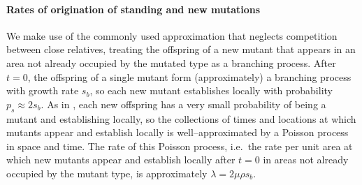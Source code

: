 \documentclass{article}
\begin{document}
\paragraph{Rates of origination of standing and new mutations}
We make use of the commonly used approximation that neglects competition between close relatives,
treating the offspring of a new mutant that appears in an area not already occupied by the mutated type
as a branching process.
After $t=0$, the offspring of a single mutant form (approximately) a branching process with growth rate $s_b$,
so each new mutant establishes locally with probability $p_s \approx 2s_b$.
As in \cite{ralphcoop2010}, each new offspring has a very small probability of being a mutant and establishing locally,
so the collections of times and locations at which mutants appear and establish locally 
is well--approximated by a Poisson process in space and time.
The rate of this Poisson process,
i.e.\ the rate per unit area at which new mutants appear and establish locally after $t=0$ in areas not already occupied by the mutant type,
is approximately $\lambda = 2 \mu \rho s_b$.
\end{document}

